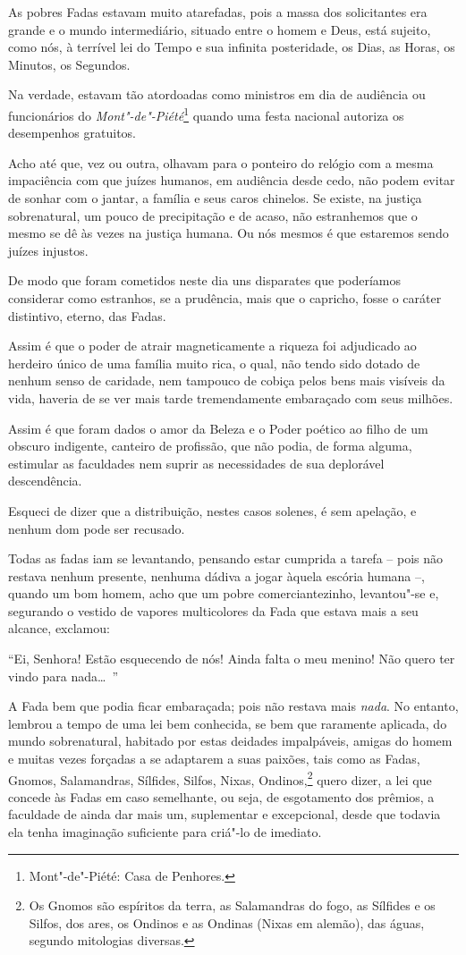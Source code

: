As pobres Fadas estavam muito atarefadas, pois a massa dos solicitantes
era grande e o mundo intermediário, situado entre o homem e Deus, está
sujeito, como nós, à terrível lei do Tempo e sua infinita
posteridade, os Dias, as Horas, os Minutos, os Segundos.

Na verdade, estavam tão atordoadas como ministros em dia de
audiência ou funcionários do \textit{Mont"-de"-Piété}\protect\footnote{ Mont"-de"-Piété: Casa de Penhores.}
quando uma festa nacional autoriza os desempenhos gratuitos. \linebreak


\noindent{}Acho até que, vez ou outra, olhavam para o ponteiro do relógio com a mesma
impaciência com que juízes humanos, em audiência desde cedo, não
podem evitar de sonhar com o jantar, a família e seus caros
chinelos. Se existe, na justiça sobrenatural, um pouco de precipitação
e de acaso, não estranhemos que o mesmo se dê às vezes na justiça
humana. Ou nós mesmos é que estaremos sendo juízes injustos.

De modo que foram cometidos neste dia uns disparates que poderíamos
considerar como estranhos, se a prudência, mais que o capricho, fosse o
caráter distintivo, eterno, das Fadas.

Assim é que o poder de atrair magneticamente a riqueza foi adjudicado ao
herdeiro único de uma família muito rica, o qual, não tendo sido dotado
de nenhum senso de caridade, nem tampouco de cobiça pelos bens
mais visíveis da vida, haveria de se ver mais tarde tremendamente
embaraçado com seus milhões.

Assim é que foram dados o amor da Beleza e o Poder poético ao filho de um
obscuro indigente, canteiro de profissão, que não podia, de forma
alguma, estimular as faculdades nem suprir as necessidades de sua
deplorável descendência.

Esqueci de dizer que a distribuição, nestes casos solenes, é sem
apelação, e nenhum dom pode ser recusado.

Todas as fadas iam se levantando, pensando estar cumprida a tarefa
– pois não restava nenhum presente, nenhuma dádiva a jogar àquela escória humana –, quando um bom homem, acho que um pobre
comerciantezinho, levantou"-se e, segurando o vestido de vapores
multicolores da Fada que estava mais a seu alcance, exclamou:

“Ei, Senhora! Estão esquecendo de nós! Ainda falta
o meu menino! Não quero ter vindo para nada\ldots\ ”

A Fada bem que podia ficar embaraçada; pois não restava mais \textit{nada}. No
entanto, lembrou a tempo de uma lei bem conhecida, se bem que raramente
aplicada, do mundo sobrenatural, habitado por estas deidades
impalpáveis, amigas do homem e muitas vezes forçadas a se adaptarem a
suas paixões, tais como as Fadas, Gnomos, Salamandras,
Sílfides, Silfos, Nixas, Ondinos,\protect\footnote{ Os Gnomos são espíritos da terra, as Salamandras do fogo, as Sílfides
e os Silfos, dos ares, os Ondinos e as Ondinas (Nixas em alemão), das
águas, segundo mitologias diversas.} quero dizer, a lei que concede às Fadas em
caso semelhante, ou seja, de esgotamento dos prêmios, a
faculdade de ainda dar mais um, suplementar e excepcional, desde que todavia
ela tenha imaginação suficiente para criá"-lo de imediato.

